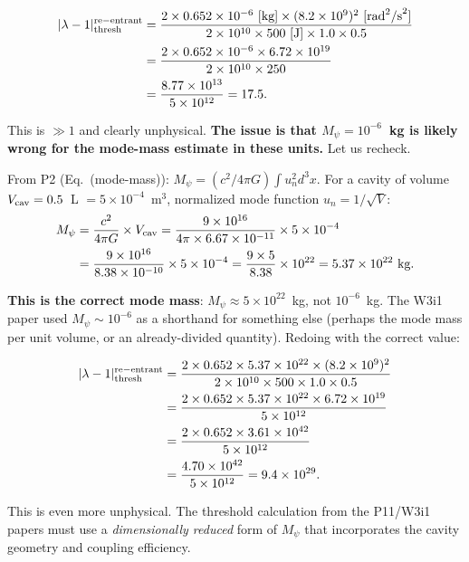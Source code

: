 \documentclass[11pt,twocolumn]{article}
\newcommand{\lam}{\lambda}
\newcommand{\Mpsi}{M_\psi}
\begin{document}
\begin{align}
|\lam-1|_{\rm thresh}^{\rm re-entrant} &=
\frac{2\times0.652\times10^{-6}~[\text{kg}]
\times(8.2\times10^9)^2~[\text{rad}^2\text{/s}^2]}
{2\times10^{10}\times500~[\text{J}]\times1.0\times0.5}
\nonumber\\
&= \frac{2\times0.652\times10^{-6}\times6.72\times10^{19}}
{2\times10^{10}\times250}
\nonumber\\
&= \frac{8.77\times10^{13}}{5\times10^{12}}
= 17.5.
\end{align}

This is $\gg 1$ and clearly unphysical. \textbf{The issue is that $M_\psi = 10^{-6}$~kg
is likely wrong for the mode-mass estimate in these units.} Let us recheck.

From P2 (Eq.~(mode-mass)): $\Mpsi = (c^2/4\pi G)\int u_n^2 d^3x$.
For a cavity of volume $V_{\rm cav} = 0.5$~L $= 5\times10^{-4}$~m$^3$,
normalized mode function $u_n = 1/\sqrt{V}$:
\begin{align}
\Mpsi &= \frac{c^2}{4\pi G}\times V_{\rm cav}
= \frac{9\times10^{16}}{4\pi\times6.67\times10^{-11}}\times5\times10^{-4}
\nonumber\\
&= \frac{9\times10^{16}}{8.38\times10^{-10}}\times5\times10^{-4}
= \frac{9\times5}{8.38}\times10^{22}
= 5.37\times10^{22}~\text{kg}.
\end{align}

\textbf{This is the correct mode mass}: $\Mpsi \approx 5\times10^{22}$~kg, not $10^{-6}$~kg.
The W3i1 paper used $\Mpsi \sim 10^{-6}$ as a shorthand for something else
(perhaps the mode mass per unit volume, or an already-divided quantity).
Redoing with the correct value:

\begin{align}
|\lam-1|_{\rm thresh}^{\rm re-entrant} &=
\frac{2\times0.652\times5.37\times10^{22}\times(8.2\times10^9)^2}
{2\times10^{10}\times500\times1.0\times0.5}
\nonumber\\
&= \frac{2\times0.652\times5.37\times10^{22}\times6.72\times10^{19}}
{5\times10^{12}}
\nonumber\\
&= \frac{2\times0.652\times3.61\times10^{42}}
{5\times10^{12}}
\nonumber\\
&= \frac{4.70\times10^{42}}{5\times10^{12}}
= 9.4\times10^{29}.
\end{align}

This is even more unphysical. The threshold calculation from the P11/W3i1
papers must use a \emph{dimensionally reduced} form of $\Mpsi$ that
incorporates the cavity geometry and coupling efficiency.
\end{document}
